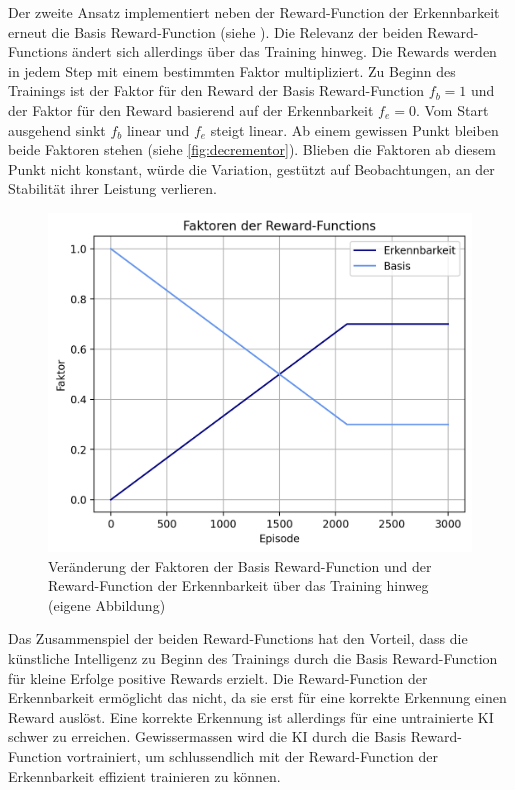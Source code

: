 Der zweite Ansatz implementiert neben der Reward-Function der Erkennbarkeit
erneut die Basis Reward-Function (siehe ). Die Relevanz
der beiden Reward-Functions ändert sich allerdings über das Training hinweg. Die
Rewards werden in jedem Step mit einem bestimmten Faktor multipliziert. Zu
Beginn des Trainings ist der Faktor für den Reward der Basis Reward-Function
$f_b = 1$ und der Faktor für den Reward basierend auf der Erkennbarkeit $f_e =
0$. Vom Start ausgehend sinkt $f_b$ linear und $f_e$ steigt linear. Ab einem
gewissen Punkt bleiben beide Faktoren stehen (siehe \autoref{fig:decrementor}).
Blieben die Faktoren ab diesem Punkt nicht konstant, würde die Variation,
gestützt auf Beobachtungen, an der Stabilität ihrer Leistung verlieren.

\newpage

\begin{figure}[!ht]
 \centering
 \includegraphics[width=\textwidth-2cm]{images/methode/decrementor.png}
 \caption{Veränderung der Faktoren der Basis Reward-Function und der Reward-Function der Erkennbarkeit über das Training hinweg (eigene Abbildung)}\label{fig:decrementor}
\end{figure}
 
Das Zusammenspiel der beiden Reward-Functions hat den Vorteil, dass die
künstliche Intelligenz zu Beginn des Trainings durch die Basis Reward-Function
für kleine Erfolge positive Rewards erzielt. Die Reward-Function der
Erkennbarkeit ermöglicht das nicht, da sie erst für eine korrekte Erkennung
einen Reward auslöst. Eine korrekte Erkennung ist allerdings für eine
untrainierte KI schwer zu erreichen. Gewissermassen wird die KI durch die Basis
Reward-Function vortrainiert, um schlussendlich mit der Reward-Function der
Erkennbarkeit effizient trainieren zu können.
 
